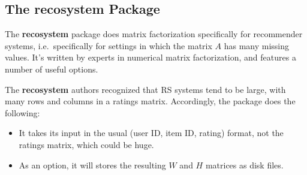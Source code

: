 % 
% 
% 
% 

\subsection{The recosystem Package}

The \textbf{recosystem} package does matrix factorization specifically
for recommender systems, i.e.\ specifically for settings in which the
matrix $A$ has many missing values.  It's written by experts in
numerical matrix factorization, and features a number of useful options.

The \textbf{recosystem} authors recognized that RS systems tend to be
large, with many rows and columns in a ratings matrix.  Accordingly, the
package does the following:

\begin{itemize}

\item It takes its input in the usual (user ID, item ID, rating) format,
not the ratings matrix, which could be huge.

\item As an option, it will stores the resulting $W$ and $H$ matrices as
disk files.

\end{itemize} 

